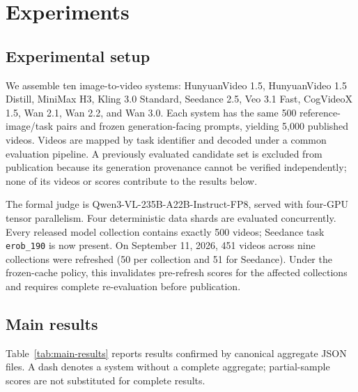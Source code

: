 \section{Experiments}
\label{sec:experiments}

\subsection{Experimental setup}

We assemble ten image-to-video systems: HunyuanVideo 1.5, HunyuanVideo 1.5 Distill, MiniMax H3, Kling 3.0 Standard, Seedance 2.5, Veo 3.1 Fast, CogVideoX 1.5, Wan 2.1, Wan 2.2, and Wan 3.0. Each system has the same 500 reference-image/task pairs and frozen generation-facing prompts, yielding 5,000 published videos. Videos are mapped by task identifier and decoded under a common evaluation pipeline. A previously evaluated candidate set is excluded from publication because its generation provenance cannot be verified independently; none of its videos or scores contribute to the results below.

The formal judge is Qwen3-VL-235B-A22B-Instruct-FP8, served with four-GPU tensor parallelism. Four deterministic data shards are evaluated concurrently. Every released model collection contains exactly 500 videos; Seedance task \texttt{erob\_190} is now present. On September 11, 2026, 451 videos across nine collections were refreshed (50 per collection and 51 for Seedance). Under the frozen-cache policy, this invalidates pre-refresh scores for the affected collections and requires complete re-evaluation before publication.

\subsection{Main results}

Table~\ref{tab:main-results} reports results confirmed by canonical aggregate JSON files. A dash denotes a system without a complete aggregate; partial-sample scores are not substituted for complete results.

